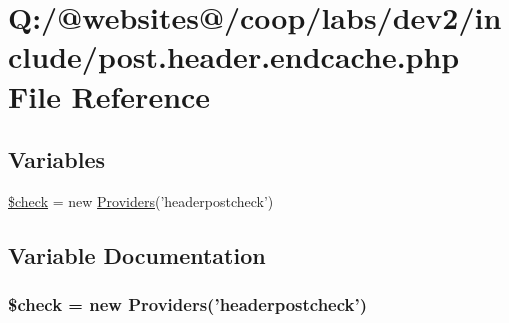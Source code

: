 \hypertarget{post_8header_8endcache_8php}{\section{Q\-:/@websites@/coop/labs/dev2/include/post.header.\-endcache.\-php File Reference}
\label{post_8header_8endcache_8php}
}
\subsection*{Variables}
\begin{DoxyCompactItemize}
\item 
\hyperlink{post_8header_8endcache_8php_a830cf70d25fefacddcf4c6bc3fd7a0e0}{\$check} = new \hyperlink{class_providers}{Providers}('headerpostcheck')
\end{DoxyCompactItemize}


\subsection{Variable Documentation}
\hypertarget{post_8header_8endcache_8php_a830cf70d25fefacddcf4c6bc3fd7a0e0}{
\subsubsection[{\$check}]{\setlength{\rightskip}{0pt plus 5cm}\$check = new {\bf Providers}('headerpostcheck')}}\label{post_8header_8endcache_8php_a830cf70d25fefacddcf4c6bc3fd7a0e0}
